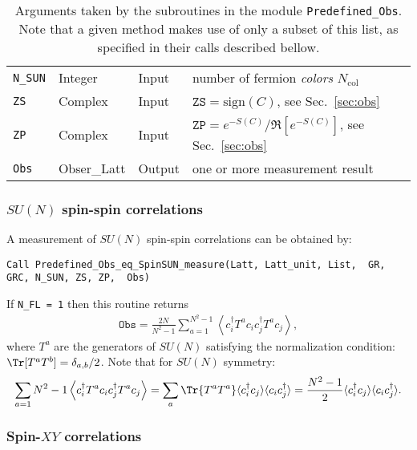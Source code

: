 \begin{table}[h]
\begin{center}
\begin{tabular}{@{} p{}  p{} p{} p{}  @{}}
			\texttt{N\_SUN}               & Integer    & Input  & number of fermion \emph{colors} $N_{\mathrm{col}}$\\
			\texttt{ZS}                   & Complex    & Input  & $\texttt{ZS} = \text{sign}(C)$, see Sec.~\ref{sec:obs}\\
			\texttt{ZP}                   & Complex    & Input  & $\texttt{ZP} = e^{-S(C)}/\Re \left[e^{-S(C)} \right]$, see Sec.~\ref{sec:obs}\\
			\texttt{Obs}                  & Obser\_Latt& Output & one or more measurement result\\
			\bottomrule
		\end{tabular}
		\caption{Arguments taken by the subroutines in the module \texttt{Predefined\_Obs}. Note that a given method makes use of only a subset of this list, as specified in their calls described bellow.}		\label{table:predefined_obs}
	\end{center}
\end{table}


\subsubsection{$SU(N)$ spin-spin correlations}

A measurement of $SU(N)$ spin-spin correlations can be obtained by:

\begin{lstlisting}[style=fortran]
Call Predefined_Obs_eq_SpinSUN_measure(Latt, Latt_unit, List,  GR, GRC, N_SUN, ZS, ZP,  Obs)
\end{lstlisting}

If \texttt{N\_FL = 1} then  this routine returns
\begin{align}
\texttt{Obs} = \frac{2N}{N^2-1}\sum_{a=1}^{N^2 - 1}  \left\langle c^{\dagger}_i T^a c_i  c^{\dagger}_j T^a  c_j\right\rangle,
\end{align}
where $T^a$ are the generators of $SU(N)$ satisfying the normalization condition:  $\Tr [ T^a  T^b ]= \delta_{a,b}/2$. Note that for $SU(N)$ symmetry:
\begin{align}
\sum_{a=1}{N^2 - 1 }  \left\langle c^{\dagger}_i T^a c_i  c^{\dagger}_j T^a  c_j\right\rangle   = \sum_{a} \Tr{T^a T^a} \langle c^{\dagger}_i c_j\rangle \langle c_i c^{\dagger}_j\rangle = \frac{N^2 -1}{2} \langle c^{\dagger}_i c_j\rangle \langle c_i c^{\dagger}_j\rangle.
\end{align}

\subsubsection{Spin-$XY$ correlations}

